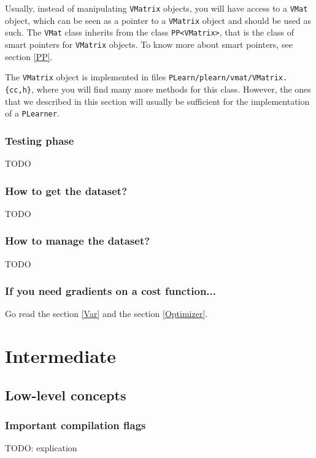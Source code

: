 \documentclass[11pt]{book}
\begin{document}
Usually, instead of manipulating {\tt VMatrix} objects,
you will have access to a {\tt VMat} object, which
can be seen as a pointer to a {\tt VMatrix} object
and should be used as such. The {\tt VMat} class
inherits from the class {\tt PP<VMatrix>}, that
is the class of smart pointers for {\tt VMatrix} objects.
To know more about smart pointers, see section \ref{PP}.

The {\tt VMatrix} object is implemented in files
{\tt PLearn/plearn/vmat/VMatrix.\{cc,h\}}, where
you will find many more methods for this class.
However, the ones that we described in this
section will usually be sufficient for the
implementation of a {\tt PLearner}.

\subsection{Testing phase}
TODO

\subsection{How to get the dataset?}
TODO

\subsection{How to manage the dataset?}
TODO


\subsection{If you need gradients on a cost function...}

Go read the section \ref{Var} and the section \ref{Optimizer}.

\chapter{Intermediate}

\section{Low-level concepts}

\subsection{Important compilation flags}
TODO: explication
\end{document}
